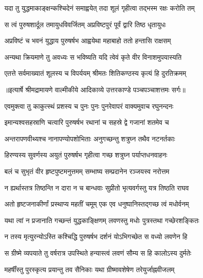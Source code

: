 \twolineshloka
{यदा तु युद्धमाकाङ्क्षन्कश्चिदेनं समाह्वयेत्}
{तदा शूलं गृहीत्वा तद्भस्म रक्षः करोति तम्} %

\twolineshloka
{स त्वं पुरुषशार्दूल तमायुधविवर्जितम्}
{अप्रविष्टपुरं पूर्वं द्वारि तिष्ठ धृतायुधः} %

\twolineshloka
{अप्रविष्टं च भवनं युद्धाय पुरुषर्षभ}
{आह्वयेथा महाबाहो ततो हन्तासि राक्षसम्} %

\twolineshloka
{अन्यथा क्रियमाणे तु अवध्यः स भविष्यति}
{यदि त्वेवं कृते वीर विनाशमुपयास्यति} %

\twolineshloka
{एतत्ते सर्वमाख्यातं शूलस्य च विपर्ययम्}
{श्रीमतः शितिकण्ठस्य कृत्यं हि दुरतिक्रमम्} %


{॥इत्यार्षे श्रीमद्रामायणे वाल्मीकीये आदिकाव्ये उत्तरकाण्डे पञ्चपञ्चाशत्तमः सर्गः॥}


\twolineshloka
{एवमुक्त्वा तु काकुत्स्थं प्रशस्य च पुनः पुनः}
{पुनरेवापरं वाक्यमुवाच रघुनन्दनः} %

\twolineshloka
{इमान्यश्वसहस्राणि चत्वारि पुरुषर्षभ}
{रथानां च सहस्रे द्वे गजानां शतमेव च} %

\twolineshloka
{अन्तरापणवीथ्यश्च नानापण्योपशोभिताः}
{अनुगच्छन्तु शत्रुघ्न तथैव नटनर्तकाः} %

\twolineshloka
{हिरण्यस्य सुवर्णस्य अयुतं पुरुषर्षभ}
{गृहीत्वा गच्छ शत्रुघ्न पर्याप्तधनवाहनः} %

\twolineshloka
{बलं च सुभृतं वीर हृष्टपुष्टमनुत्तमम्}
{सम्भाष्य सम्प्रदानेन रञ्जयस्व नरोत्तम} %

\twolineshloka
{न ह्यर्थास्तत्र तिष्ठन्ति न दारा न च बान्धवाः}
{सुप्रीतो भृत्यवर्गस्तु यत्र तिष्ठति राघव} %

\twolineshloka
{अतो हृष्टजनाकीर्णां प्रस्थाप्य महतीं चमूम्}
{एक एव धनुष्पानिस्तद्गच्छ त्वं मधोर्वनम्} %

\twolineshloka
{यथा त्वां न प्रजानाति गच्छन्तं युद्धकाङ्क्षिणम्}
{लवणस्तु मधोः पुत्रस्तथा गच्छेरशङ्कितः} %

\twolineshloka
{न तस्य मृत्युरन्योऽस्ति कश्चिद्धि पुरुषर्षभ}
{दर्शनं योऽभिगच्छेत स वध्यो लवणेन हि} %

\twolineshloka
{स ग्रीष्मे व्यपयाते तु वर्षरात्र उपस्थिते}
{हन्यास्त्वं लवणं सौम्य स हि कालोऽस्य दुर्मतेः} %

\twolineshloka
{महर्षींस्तु पुरस्कृत्य प्रयान्तु तव सैनिकाः}
{यथा ग्रीष्मावशेषेण तरेयुर्जाह्नवीजलम्} %

